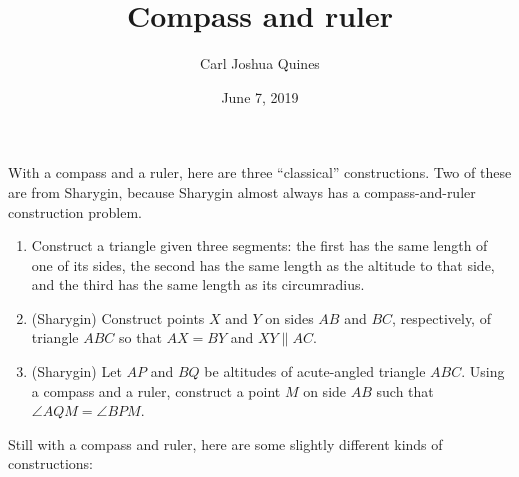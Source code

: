 \documentclass[11pt,paper=letter]{scrartcl}
\begin{document}
\title{Compass and ruler}
\author{Carl Joshua Quines}
\date{June 7, 2019}

\maketitle

\noindent With a compass and a ruler, here are three ``classical'' constructions. Two of these are from Sharygin, because Sharygin almost always has a compass-and-ruler construction problem.

\begin{enumerate}
  \item Construct a triangle given three segments: the first has the same length of one of its sides, the second has the same length as the altitude to that side, and the third has the same length as its circumradius. %

  \item (Sharygin) Construct points $X$ and $Y$ on sides $AB$ and $BC$, respectively, of triangle $ABC$ so that $AX = BY$ and $XY \parallel AC$.%

  \item (Sharygin) Let $AP$ and $BQ$ be altitudes of acute-angled triangle $ABC$. Using a compass and a ruler, construct a point $M$ on side $AB$ such that $\angle AQM = \angle BPM$. %
\end{enumerate}

\noindent Still with a compass and ruler, here are some slightly different kinds of constructions:
\end{document}
